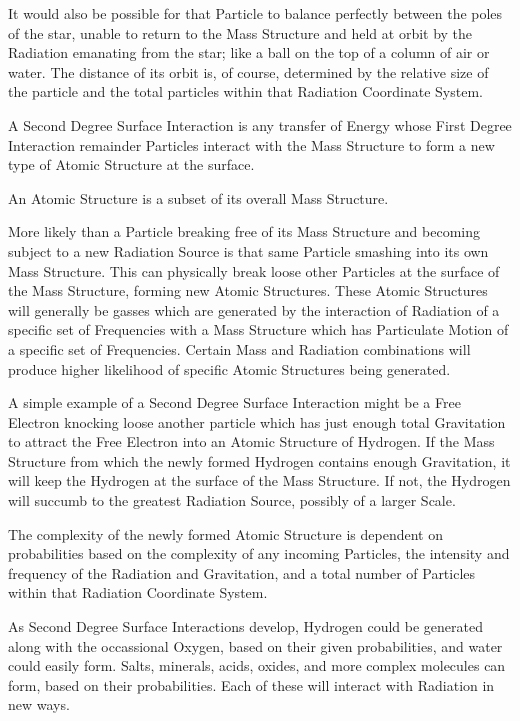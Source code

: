 \documentclass[12pt]{article}
\begin{document}
It would also be possible for that Particle to balance perfectly between the poles of the star, unable to return to the Mass Structure and held at orbit by the Radiation emanating from the star; like a ball on the top of a column of air or water. The distance of its orbit is, of course, determined by the relative size of the particle and the total particles within that Radiation Coordinate System.


\begin{thm}
   A Second Degree Surface Interaction is any transfer of Energy whose First Degree Interaction remainder Particles interact with the Mass Structure to form a new type of Atomic Structure at the surface.
\end{thm}

\begin{thm}
   An Atomic Structure is a subset of its overall Mass Structure.
\end{thm}

More likely than a Particle breaking free of its Mass Structure and becoming subject to a new Radiation Source is that same Particle smashing into its own Mass Structure. This can physically break loose other Particles at the surface of the Mass Structure, forming new Atomic Structures. These Atomic Structures will generally be gasses which are generated by the interaction of Radiation of a specific set of Frequencies with a Mass Structure which has Particulate Motion of a specific set of Frequencies. Certain Mass and Radiation combinations will produce higher likelihood of specific Atomic Structures being generated.

A simple example of a Second Degree Surface Interaction might be a Free Electron  knocking loose another particle which has just enough total Gravitation to attract the Free Electron into an Atomic Structure of Hydrogen. If the Mass Structure from which the newly formed Hydrogen contains enough Gravitation, it will keep the Hydrogen at the surface of the Mass Structure. If not, the Hydrogen will succumb to the greatest Radiation Source, possibly of a larger Scale.

The complexity of the newly formed Atomic Structure is dependent on probabilities based on the complexity of any incoming Particles, the intensity and frequency of the Radiation and Gravitation, and a total number of Particles within that Radiation Coordinate System.

As Second Degree Surface Interactions develop, Hydrogen could be generated along with the occassional Oxygen, based on their given probabilities, and water could easily form. Salts, minerals, acids, oxides, and more complex molecules can form, based on their probabilities. Each of these will interact with Radiation in new ways.
\end{document}
